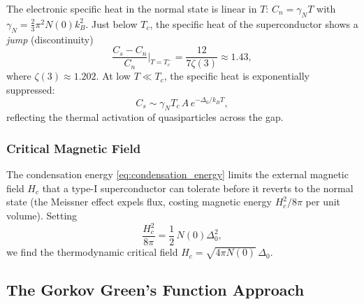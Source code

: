 The electronic specific heat in the normal state is linear in $T$:
$C_n = \gamma_N T$ with $\gamma_N = \frac{2}{3}\pi^2 N(0) k_B^2$.
Just below $T_c$, the specific heat of the superconductor shows a
\emph{jump} (discontinuity)
\begin{equation}
	\frac{C_s - C_n}{C_n}\bigg|_{T=T_c^-} = \frac{12}{7\zeta(3)} \approx 1.43,
\end{equation}
where $\zeta(3) \approx 1.202$. At low $T \ll T_c$, the specific heat is
exponentially suppressed:
\begin{equation}
	C_s \sim \gamma_N T_c\, A\, e^{-\Delta_0/k_B T},
\end{equation}
reflecting the thermal activation of quasiparticles across the gap.

\subsubsection{Critical Magnetic Field}

The condensation energy \eqref{eq:condensation_energy} limits the external
magnetic field $H_c$ that a type-I superconductor can tolerate before it
reverts to the normal state (the Meissner effect expels flux, costing magnetic
energy $H_c^2/8\pi$ per unit volume). Setting
\begin{equation}
	\frac{H_c^2}{8\pi} = \frac{1}{2}\,N(0)\Delta_0^2,
\end{equation}
we find the thermodynamic critical field $H_c = \sqrt{4\pi N(0)}\,\Delta_0$.

\subsection{The Gorkov Green's Function Approach}

